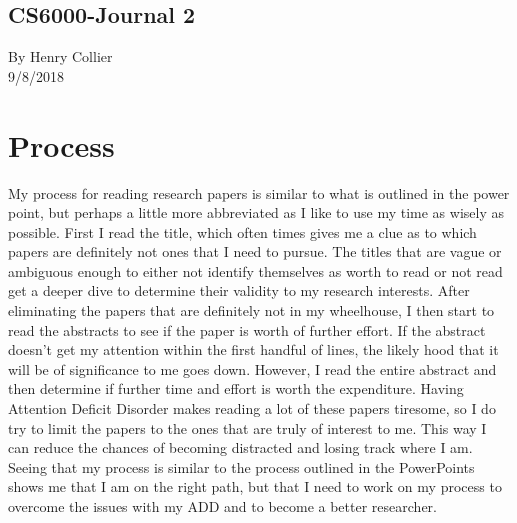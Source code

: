\documentclass[11pt]{article}
\begin{document}
\begin {center}
\section*{CS6000-Journal 2}
By Henry Collier
\\
9/8/2018
\end {center}

\section*{Process}
My process for reading research papers is similar to what is outlined in the power point, but perhaps a little more abbreviated as I like to use my time as wisely as possible. First I read the title, which often times gives me a clue as to which papers are definitely not ones that I need to pursue. The titles that are vague or ambiguous enough to either not identify themselves as worth to read or not read get a deeper dive to determine their validity to my research interests. After eliminating the papers that are definitely not in my wheelhouse, I then start to read the abstracts to see if the paper is worth of further effort. If the abstract doesn't get my attention within the first handful of lines, the likely hood that it will be of significance to me goes down. However, I read the entire abstract and then determine if further time and effort is worth the expenditure. Having Attention Deficit Disorder makes reading a lot of these papers tiresome, so I do try to limit the papers to the ones that are truly of interest to me. This way I can reduce the chances of becoming distracted and losing track where I am. Seeing that my process is similar to the process outlined in the PowerPoints shows me that I am on the right path, but that I need to work on my process to overcome the issues with my ADD and to become a better researcher.
\end{document}
